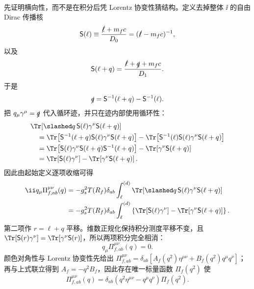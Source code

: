 \begin{derivation}
先证明横向性，而不是在积分后凭 Lorentz 协变性猜结构。定义去掉整体 $\ii$ 的自由 Dirac 传播核
\begin{equation*}
 \mathsf S(\ell)
 \equiv\frac{\slashed\ell+m_fc}{D_0}
 =(\slashed\ell-m_fc)^{-1},
\end{equation*}
以及
\begin{equation*}
 \mathsf S(\ell+q)
 =\frac{\slashed\ell+\slashed q+m_fc}{D_1}.
\end{equation*}
于是
\begin{equation*}
 \slashed q
 =\mathsf S^{-1}(\ell+q)-\mathsf S^{-1}(\ell).
\end{equation*}
把 $q_\mu\gamma^\mu=\slashed q$ 代入循环迹，并只在迹内部使用循环性：
\begin{align*}
 &\Tr\!\left[
 \slashed q\,\mathsf S(\ell)\gamma^\nu\mathsf S(\ell+q)
 \right]\\
 &\quad=
 \Tr\!\left[
 \mathsf S^{-1}(\ell+q)\mathsf S(\ell)
 \gamma^\nu\mathsf S(\ell+q)
 \right]
 -\Tr\!\left[
 \mathsf S^{-1}(\ell)\mathsf S(\ell)
 \gamma^\nu\mathsf S(\ell+q)
 \right]\\
 &\quad=
 \Tr\!\left[
 \mathsf S(\ell)\gamma^\nu
 \mathsf S(\ell+q)\mathsf S^{-1}(\ell+q)
 \right]
 -\Tr\!\left[
 \gamma^\nu\mathsf S(\ell+q)
 \right]\\
 &\quad=
 \Tr\!\left[\mathsf S(\ell)\gamma^\nu\right]
 -\Tr\!\left[\gamma^\nu\mathsf S(\ell+q)\right].
\end{align*}
因此由起始定义逐项收缩可得
\begin{align*}
 \ii q_\mu\Pi_{f,ab}^{\mu\nu}(q)
 &=-g_s^2T(R_f)\delta_{ab}
 \int_\ell^{(d)}
 \Tr\!\left[
 \slashed q\,\mathsf S(\ell)\gamma^\nu\mathsf S(\ell+q)
 \right]\\
 &=-g_s^2T(R_f)\delta_{ab}
 \int_\ell^{(d)}
 \left\{
 \Tr[\mathsf S(\ell)\gamma^\nu]
 -\Tr[\gamma^\nu\mathsf S(\ell+q)]
 \right\}.
\end{align*}
第二项作 $r=\ell+q$ 平移。维数正规化保持积分测度平移不变，且 $\Tr[\mathsf S(r)\gamma^\nu]=\Tr[\gamma^\nu\mathsf S(r)]$，所以两项积分完全相消：
\begin{equation*}
 q_\mu\Pi_{f,ab}^{\mu\nu}(q)=0.
\end{equation*}
颜色对角性与 Lorentz 协变性先给出 $\Pi_{f,ab}^{\mu\nu}=\delta_{ab}[A_f(q^2)\eta^{\mu\nu}+B_f(q^2)q^\mu q^\nu]$；再与上式联立得到 $A_f=-q^2B_f$，因此存在唯一标量函数 $\Pi_f(q^2)$ 使
\begin{equation*}
 \Pi_{f,ab}^{\mu\nu}(q)
 =\delta_{ab}(q^2\eta^{\mu\nu}-q^\mu q^\nu)\Pi_f(q^2).
\end{equation*}


\end{derivation}
